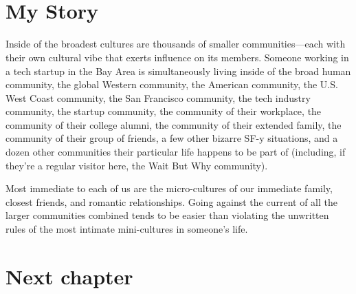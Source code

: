 \documentclass{myresume}
\begin{document}
\begin{cvHeader}
\\
\\
\end{cvHeader}
%
\section{My Story}
%
\begin{cvParagraph}
Inside of the broadest cultures are thousands of smaller communities—each with their own cultural vibe that exerts influence on its members. Someone working in a tech startup in the Bay Area is simultaneously living inside of the broad human community, the global Western community, the American community, the U.S. West Coast community, the San Francisco community, the tech industry community, the startup community, the community of their workplace, the community of their college alumni, the community of their extended family, the community of their group of friends, a few other bizarre SF-y situations, and a dozen other communities their particular life happens to be part of (including, if they’re a regular visitor here, the Wait But Why community).\par

Most immediate to each of us are the micro-cultures of our immediate family, closest friends, and romantic relationships. Going against the current of all the larger communities combined tends to be easier than violating the unwritten rules of the most intimate mini-cultures in someone’s life.
\end{cvParagraph}

\section{Next chapter}
\end{document}
